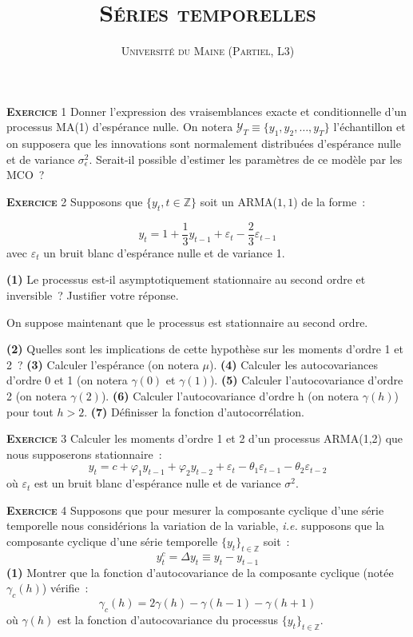 \documentclass[10pt,a4paper,notitlepage,twocolumn]{article}
\newcommand{\exercice}[1]{\textsc{\textbf{Exercice}} #1}
\newcommand{\question}[1]{\textbf{(#1)}}
\begin{document}
\title{\textsc{Séries temporelles}}
\author{\textsc{Université du Maine (Partiel, L3)}}
\date{}


\maketitle


\exercice{1} Donner l'expression des vraisemblances exacte et
conditionnelle d'un processus MA(1) d'espérance nulle. On notera
$\mathcal Y_T \equiv \{y_1,y_2,\dots,y_T\}$ l'échantillon et on
supposera que les innovations sont normalement distribuées d'espérance
nulle et de variance $\sigma_{\epsilon}^2$. Serait-il possible
d'estimer les paramètres de ce modèle par les MCO ?

\bigskip
\bigskip

\exercice{2} Supposons que $\{y_t,t\in\mathbb Z\}$ soit un ARMA($1,1$) de la forme :

\[
y_t = 1 + \frac{1}{3}y_{t-1} + \varepsilon_t - \frac{2}{3} \varepsilon_{t-1}
\]
avec $\varepsilon_t$ un bruit blanc d'espérance nulle et de variance 1.\newline

\question{1}   Le    processus   est-il   asymptotiquement
stationnaire  au   second  ordre   et  inversible~?   Justifier  votre
réponse.\newline

On suppose maintenant que le processus est stationnaire au second
ordre.\newline

\question{2} Quelles sont les implications de cette hypothèse sur les
moments d'ordre 1 et 2 ? \question{3} Calculer l'espérance (on notera
$\mu$). \question{4} Calculer les autocovariances d'ordre
0 et 1 (on notera $\gamma(0)$ et $\gamma(1)$). \question{5} Calculer
l'autocovariance d'ordre 2 (on notera $\gamma(2)$). \question{6}
Calculer l'autocovariance d'ordre h (on notera $\gamma(h)$) pour tout
$h>2$.  \question{7} Définisser la fonction d'autocorrélation.

\bigskip
\bigskip

\exercice{3} Calculer les moments d'ordre 1 et 2 d'un processus ARMA(1,2) que nous supposerons stationnaire :
\[
y_t = c + \varphi_1 y_{t-1} + \varphi_2 y_{t-2} + \varepsilon_t - \theta_1 \varepsilon_{t-1} - \theta_2 \varepsilon_{t-2}
\]
où $\varepsilon_t$ est un bruit blanc d'espérance nulle et de variance $\sigma^2$.

\exercice{4} Supposons que pour mesurer la composante cyclique d'une
série temporelle nous considérions la variation de la variable,
\emph{i.e.} supposons que la composante cyclique d'une série temporelle $\{y_t\}_{t\in\mathbb Z}$ soit :
\[
y^c_t = \Delta y_t \equiv y_t-y_{t-1}
\]
\question{1} Montrer que la fonction d'autocovariance de la composante cyclique (notée $\gamma_c(h)$) vérifie :
\[
\gamma_c(h) = 2\gamma(h)-\gamma(h-1)-\gamma(h+1)
\]
où $\gamma(h)$ est la fonction d'autocovariance du processus
$\{y_t\}_{t\in\mathbb Z}$.\newline
\end{document}
